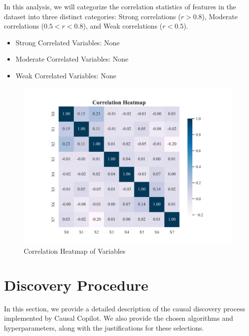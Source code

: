 \documentclass{article}
\begin{document}
\begin{minipage}[t]{0.5\linewidth}
    In this analysis, we will categorize the correlation statistics of features in the dataset into three distinct categories: Strong correlations ($r>0.8$), Moderate correlations ($0.5<r<0.8$), and Weak correlations ($r<0.5$).

\begin{itemize}
\item Strong Correlated Variables: None
\item Moderate Correlated Variables: None
\item Weak Correlated Variables: None
\end{itemize}
\vfill
\end{minipage}
\hfill
\begin{minipage}[t]{0.5\linewidth}
    \begin{figure}[H]
        \centering
        \vspace{-1.5cm}
        \includegraphics[width=\linewidth]{postprocess/test_data/20241007_184921_base_nodes8_samples1500/output_graph/eda_corr.jpg}
        \caption{\label{fig:corr}Correlation Heatmap of Variables}
    \end{figure}
\end{minipage}

\section{Discovery Procedure}

        In this section, we provide a detailed description of the causal discovery process implemented by Causal Copilot. 
        We also provide the chosen algorithms and hyperparameters, along with the justifications for these selections.
\end{document}
